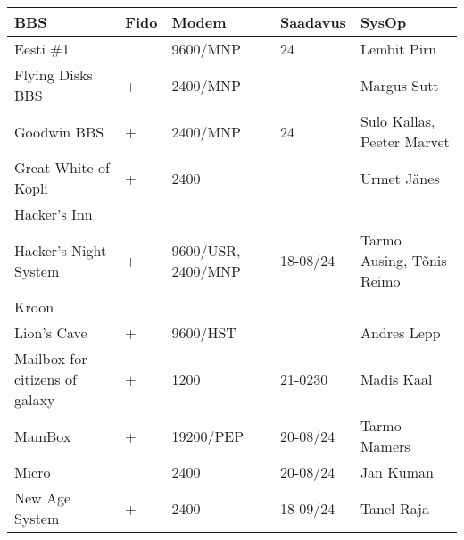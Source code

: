 \begin{table*}
\centering
\begin{tabular}{llp{2cm}p{2cm}p{5cm}}
BBS                            & Fido & Modem              & Saadavus  & SysOp                       \\
\midrule
Eesti \#1                      &      & 9600/MNP           & 24                                            & Lembit Pirn\index[ppl]{Pirn, Lembit}                 \\
Flying Disks BBS               & +    & 2400/MNP           &                                               & Margus Sutt\index[ppl]{Sutt, Margus}                 \\
Goodwin BBS                    & +    & 2400/MNP           & 24                                            & Sulo Kallas\index[ppl]{Kallas, Sulo}\index[ppl]{Marvet, Peeter}, Peeter Marvet  \\
Great White of Kopli           & +    & 2400               &                                               & Urmet Jänes\index[ppl]{Jänes, Urmet}                 \\
Hacker's Inn                   &      &                    &                                               &                             \\
Hacker's Night System          & +    & 9600/USR, 2400/MNP & 18-08/24                                      & Tarmo Ausing\index[ppl]{Ausing, Tarmo}, Tõnis Reimo\index[ppl]{Reimo, Tõnis}   \\
Kroon                          &      &                    &                                               &                             \\
Lion's Cave                    & +    & 9600/HST           &                                               & Andres Lepp\index[ppl]{Lepp, Andres}                 \\
Mailbox for citizens of galaxy & +    & 1200               & 21-0230                                       & Madis Kaal\index[ppl]{Kaal, Madis}                  \\
MamBox                         & +    & 19200/PEP          & 20-08/24                                      & Tarmo Mamers\index[ppl]{Mamers, Tarmo}                \\
Micro                          &      & 2400               & 20-08/24                                      & Jan Kuman\index[ppl]{Kuman, Jan}                   \\
New Age System                 & +    & 2400               & 18-09/24                                      & Tanel Raja\index[ppl]{Raja, Tanel}                  \\

\end{tabular}
\end{table*}
